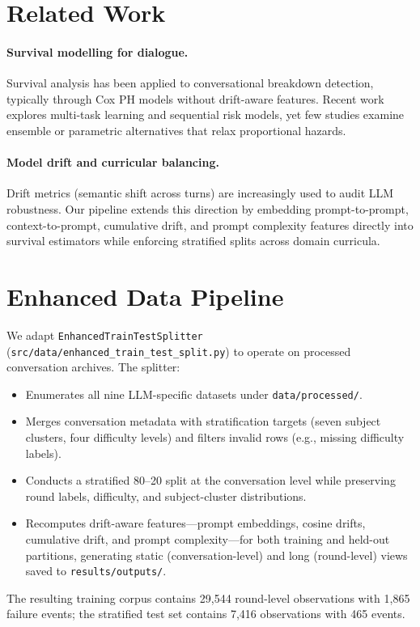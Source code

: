 ﻿\documentclass{article}
\begin{document}
\section{Related Work}
\paragraph{Survival modelling for dialogue.} Survival analysis has been applied to conversational breakdown detection, typically through Cox PH models without drift-aware features. Recent work explores multi-task learning and sequential risk models, yet few studies examine ensemble or parametric alternatives that relax proportional hazards.
\paragraph{Model drift and curricular balancing.} Drift metrics (semantic shift across turns) are increasingly used to audit LLM robustness. Our pipeline extends this direction by embedding prompt-to-prompt, context-to-prompt, cumulative drift, and prompt complexity features directly into survival estimators while enforcing stratified splits across domain curricula.

\section{Enhanced Data Pipeline}
We adapt \texttt{EnhancedTrainTestSplitter} (\texttt{src/data/enhanced\_train\_test\_split.py}) to operate on processed conversation archives. The splitter:
\begin{itemize}
    \item Enumerates all nine LLM-specific datasets under \texttt{data/processed/}.
    \item Merges conversation metadata with stratification targets (seven subject clusters, four difficulty levels) and filters invalid rows (e.g., missing difficulty labels).
    \item Conducts a stratified 80--20 split at the conversation level while preserving round labels, difficulty, and subject-cluster distributions.
    \item Recomputes drift-aware features---prompt embeddings, cosine drifts, cumulative drift, and prompt complexity---for both training and held-out partitions, generating static (conversation-level) and long (round-level) views saved to \texttt{results/outputs/}.
\end{itemize}
The resulting training corpus contains 29,544 round-level observations with 1,865 failure events; the stratified test set contains 7,416 observations with 465 events.
\end{document}

